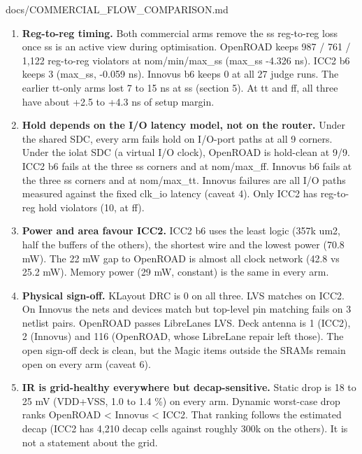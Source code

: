 \begin{relocated}{docs/COMMERCIAL_FLOW_COMPARISON.md}
\begin{enumerate}
\def\labelenumi{\arabic{enumi}.}
\tightlist
\item
  \textbf{Reg-to-reg timing.} Both commercial arms remove the ss
  reg-to-reg loss once ss is an active view during optimisation.
  OpenROAD keeps 987 / 761 / 1,122 reg-to-reg violators at
  nom/\allowbreak{}min/\allowbreak{}max\_\allowbreak{}ss (max\_ss -4.326
  ns). ICC2 b6 keeps 3 (max\_ss, -0.059 ns). Innovus b6 keeps 0 at all
  27 judge runs. The earlier tt-only arms lost 7 to 15 ns at ss (section
  5). At tt and ff, all three have about +2.5 to +4.3 ns of setup
  margin.
\item
  \textbf{Hold depends on the I/O latency model, not on the router.}
  Under the shared SDC, every arm fails hold on I/O-port paths at all 9
  corners. Under the iolat SDC (a virtual I/O clock), OpenROAD is
  hold-clean at 9/9. ICC2 b6 fails at the three ss corners and at
  nom/\allowbreak{}max\_\allowbreak{}ff. Innovus b6 fails at the three
  ss corners and at nom/\allowbreak{}max\_\allowbreak{}tt.
  Innovus\textquotesingle{} failures are all I/O paths measured against
  the fixed clk\_io latency (caveat 4). Only ICC2 has reg-to-reg hold
  violators (10, at ff).
\item
  \textbf{Power and area favour ICC2.} ICC2 b6 uses the least logic
  (357k um2, half the buffers of the others), the shortest wire and the
  lowest power (70.8 mW). The 22 mW gap to OpenROAD is almost all clock
  network (42.8 vs 25.2 mW). Memory power (29 mW, constant) is the same
  in every arm.
\item
  \textbf{Physical sign-off.} KLayout DRC is 0 on all three. LVS matches
  on ICC2. On Innovus the nets and devices match but top-level pin
  matching fails on 3 netlist  pairs. OpenROAD passes
  LibreLane\textquotesingle s LVS. Deck antenna is 1 (ICC2), 2 (Innovus)
  and 116 (OpenROAD, whose LibreLane repair left those). The open
  sign-off deck is clean, but the Magic  items outside the
  SRAMs remain open on every arm (caveat 6).
\item
  \textbf{IR is grid-healthy everywhere but decap-sensitive.} Static
  drop is 18 to 25 mV (VDD+VSS, 1.0 to 1.4 \%) on every arm. Dynamic
  worst-case drop ranks OpenROAD \textless{} Innovus \textless{} ICC2.
  That ranking follows the estimated decap (ICC2 has 4,210 decap cells
  against roughly 300k on the others). It is not a statement about the
  grid.
\end{enumerate}


\end{relocated}
